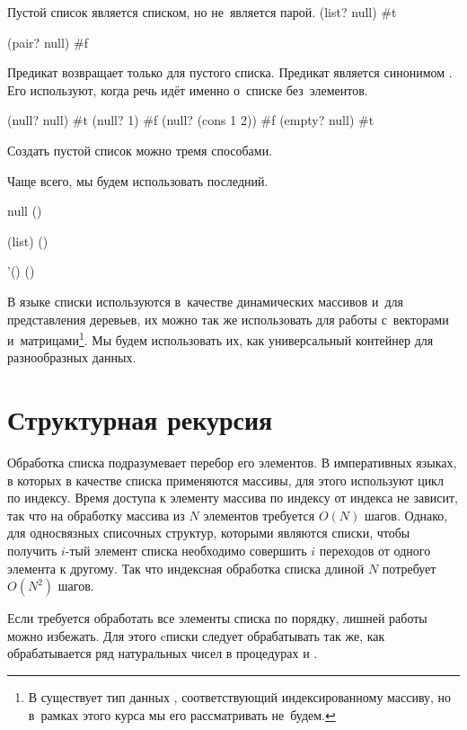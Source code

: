\begin{example}{%
Пустой список является списком, но не~является парой.} 
\REPL
  {(list? null)}
  {#t} 

\REPL
  {(pair? null)}
  {#f}
\end{example}

\begin{example}{%
Предикат  возвращает   только для пустого списка.
Предикат  является синонимом . Его используют, когда речь идёт именно о~списке без~элементов.}

\REPL
  {(null? null)}
  {#t}
\REPL
  {(null? 1)}
  {#f}
\REPL
  {(null? (cons 1 2))}
  {#f}
\REPL
  {(empty? null)}
  {#t}
\end{example}

\vspace{-\medskipamount}
\begin{example}{Создать пустой список можно тремя способами.

Чаще всего, мы будем использовать последний.}
\REPL
  {null}
  {()}

\REPL
  {(list)}
  {()}

\REPL
  {'()}
  {()}
\end{example}

В языке \Scheme списки используются в~качестве динамических массивов и~для представления деревьев, их можно так же использовать для работы с~векторами и~матрицами\footnote{В \Scheme существует тип данных , соответствующий индексированному массиву, но в~рамках этого курса мы его рассматривать не~будем.}. Мы будем использовать их, как универсальный контейнер для разнообразных данных.

\section{Структурная рекурсия}%
\label{struct-recursion}%
Обработка списка подразумевает перебор его элементов. В императивных языках, в которых в качестве списка применяются массивы, для этого используют цикл по индексу. Время доступа к элементу массива по индексу от индекса не зависит, так что на обработку массива из $N$ элементов требуется $O(N)$ шагов. 
Однако, для односвязных списочных структур, которыми являются списки, чтобы получить $i$-тый элемент списка необходимо совершить $i$ переходов от одного элемента к другому. Так что индексная обработка списка длиной $N$ потребует $O(N^2)$ шагов.

Если требуется обработать все элементы списка по порядку, лишней работы можно избежать. Для этого cписки следует обрабатывать так же, как обрабатывается ряд натуральных чисел в процедурах  и . 

